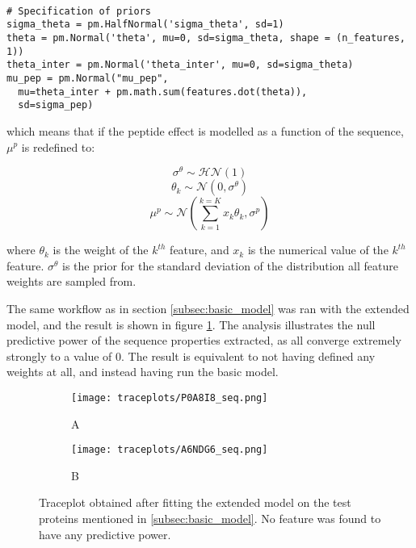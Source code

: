 \begin{verbatim}

# Specification of priors
sigma_theta = pm.HalfNormal('sigma_theta', sd=1)
theta = pm.Normal('theta', mu=0, sd=sigma_theta, shape = (n_features, 1))
theta_inter = pm.Normal('theta_inter', mu=0, sd=sigma_theta)
mu_pep = pm.Normal("mu_pep",
  mu=theta_inter + pm.math.sum(features.dot(theta)),
  sd=sigma_pep)   
\end{verbatim}

which means that if the peptide effect is modelled as a function of the sequence, $\mu^p$ is redefined to:

        
\begin{equation}
\nonumber \sigma^{\theta} \sim \mathcal{HN}(1)
\end{equation}
\begin{equation}
\nonumber \theta_k \sim \mathcal{N}(0, \sigma^{\theta})
\end{equation}
\begin{equation}
\nonumber \mu^p \sim \mathcal{N}(\sum_{k=1}^{k=K}{x_k \theta_k}, \sigma^p)
\end{equation}

where $\theta_k$ is the weight of the $k^{th}$ feature, and $x_k$ is the numerical value of the $k^{th}$ feature. $\sigma^{\theta}$ is the prior for the standard deviation of the distribution all feature weights are sampled from.

The same workflow as in section \ref{subsec:basic_model} was ran with the extended model, and the result is shown in figure \ref{fig:traceplots_seq}. The analysis illustrates the null predictive power of the sequence properties extracted, as all converge extremely strongly to a value of 0. The result is equivalent to not having defined any weights at all, and instead having run the basic model.



\begin{figure}[H]
\begin{subfigure}{\textwidth}
\centering
\caption*{A}
\texttt{[image: traceplots/P0A8I8\_seq.png]}
\end{subfigure}
\bigskip
\begin{subfigure}{\textwidth}
\centering
\caption*{B}
\texttt{[image: traceplots/A6NDG6\_seq.png]}
\end{subfigure}
\caption[Traceplot from sequence modelling of peptide effect]{Traceplot obtained after fitting the extended model on the test proteins mentioned in \ref{subsec:basic_model}. No feature was found to have any predictive power.}
\label{fig:traceplots_seq}
\end{figure}

